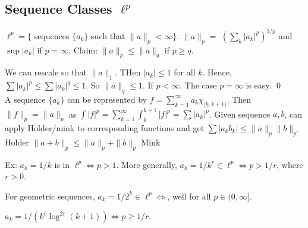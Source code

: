 \subsection{Sequence Classes $\ell^p$}

$\ell^p= \{$ sequences $\{a_k\}$ such that $\|a\|_p<\infty\}$. $\|a\|_p=$ $(\sum_k |a_k|^p)^{1/p}$ and $\sup |a_k|$ if $p=\infty$. Claim: $\|a\|_p \leq \|a\|_q$ if $p \geq q$.  

\pf We can rescale so that $\|a\|_1$. THen $|a_k| \leq 1$ for all $k$. Hence, $\sum |a_k|^p \leq \sum |a_k|^q \leq 1$. So $\|a\|_q \leq 1$. If $p<\infty$. The case $p=\infty$ is easy. \qed \\

A sequence $\{a_k\}$ can be represented by $f= \sum_{k=1}^\infty a_k \chi_{[k,k+1)}$. Then $\|f\|_p= \|a\|_p$ as $\int |f|^p= \sum_{k=1}^\infty \int_k^{k+1} |f|^p = \sum |a_k|^p$. Given sequence $a,b$, can apply Holder/mink to corresponding functions and get 
$\sum |a_kb_k| \leq \|a\|_p \|b\|_{p'}$ Holder
$\|a+b\|_p \leq \|a\|_p + \|b\|_p$ Mink

Ex: $a_k=1/k$ is in $\ell^p \iff p>1$. More generally, $a_k= 1/k^r \in \ell^p \iff p>1/r$, where $r>0$.

For geometric sequences, $a_k= 1/2^k \in \ell^p \iff $, well for all $p \in (0,\infty]$. 

$a_k= 1/(k^r \log^{2r}(k+1)) \iff p \geq 1/r$. 

























